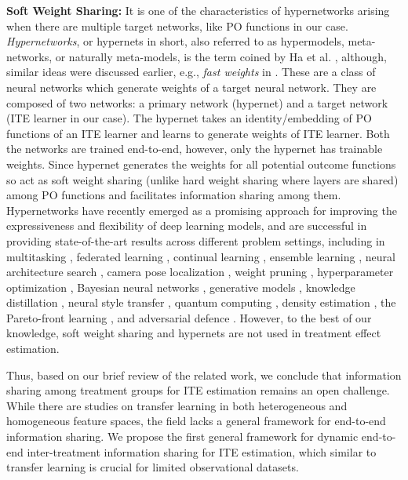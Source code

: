 \documentclass{article}
\begin{document}
\textbf{Soft Weight Sharing:} It is one of the characteristics of hypernetworks arising when there are multiple target networks, like PO functions in our case. \textit{Hypernetworks}, or hypernets in short, also referred to as hypermodels, meta-networks, or naturally meta-models, is the term coined by Ha et al. \cite{ha2017hypernetworks}, although, similar ideas were discussed earlier, e.g., \textit{fast weights} in \cite{schmidhuber1992learning}. These are a class of neural networks which generate weights of a target neural network. They are composed of two networks: a primary network (hypernet) and a target network (ITE learner in our case). The hypernet takes an identity/embedding of PO functions of an ITE learner and learns to generate weights of ITE learner. Both the networks are trained end-to-end, however, only the hypernet has trainable weights. Since hypernet generates the weights for all potential outcome functions so act as soft weight sharing (unlike hard weight sharing where layers are shared) among PO functions and facilitates information sharing among them.
Hypernetworks have recently emerged as a promising approach for improving the expressiveness and flexibility of deep learning models, and are successful in providing state-of-the-art results across different problem settings, including in multitasking \cite{tay2021hypergrid}, federated learning \cite{litany2022federated}, continual learning \cite{Oswald2020Continual}, ensemble learning \cite{kristiadi2019predictive}, neural architecture search \cite{peng2020cream}, camera pose localization \cite{ferens2023hyperpose}, weight pruning \cite{liu2019metapruning}, hyperparameter optimization \cite{lorraine2018stochastic}, Bayesian neural networks \cite{deutsch2019generative}, generative models \cite{deutsch2019generative}, knowledge distillation \cite{wu2023hyperinr}, neural style transfer \cite{Ruta2023}, quantum computing \cite{carrasquilla2023quantum}, density estimation \cite{Hofer2023}, the Pareto-front learning \cite{tran2023framework}, and adversarial defence \cite{sun2017hypernetworks}. However, to the best of our knowledge, soft weight sharing and hypernets are not used in treatment effect estimation.

Thus, based on our brief review of the related work, we conclude that information sharing among treatment groups for ITE estimation remains an open challenge. While there are studies on transfer learning in both heterogeneous and homogeneous feature spaces, the field lacks a general framework for end-to-end information sharing. We propose the first general framework for dynamic end-to-end inter-treatment information sharing for ITE estimation, which similar to transfer learning is crucial for limited observational datasets.
\end{document}
